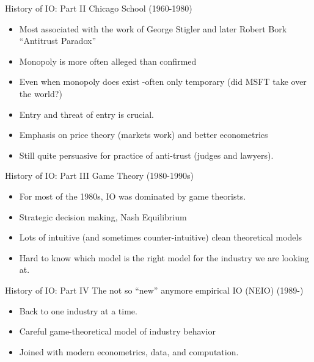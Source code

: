 \documentclass[xcolor=pdftex,dvipsnames,table,mathserif,aspectratio=169]{beamer}
\begin{document}
\begin{frame}{History of IO: Part II}
Chicago School (1960-1980)
\begin{itemize}
\item Most associated with the work of George Stigler and later Robert Bork ``Antitrust Paradox''
\item Monopoly is more often alleged than confirmed
\item Even when monopoly does exist -often only temporary (did MSFT take over the world?)
\item Entry and threat of entry is crucial.
\item Emphasis on price theory (markets work) and better econometrics
\item Still quite persuasive for practice of anti-trust (judges and lawyers).
\end{itemize}
\end{frame}


\begin{frame}{History of IO: Part III}
Game Theory (1980-1990s)
\begin{itemize}
\item For most of the 1980s, IO was dominated by game theorists.
\item Strategic decision making, Nash Equilibrium
\item Lots of intuitive (and sometimes counter-intuitive) clean theoretical models
\item Hard to know which model is the right model for the industry we are looking at.
\end{itemize}
\end{frame}


\begin{frame}{History of IO: Part IV}
The not so ``new'' anymore empirical IO (NEIO) (1989-)
\begin{itemize}
\item Back to one industry at a time.
\item Careful game-theoretical model of industry behavior
\item Joined with modern econometrics, data, and computation.
\end{itemize}
\end{frame}
\end{document}
